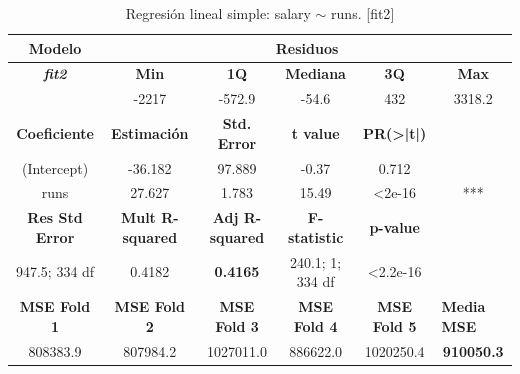 \documentclass[a4paper,12pt, oneside]{book}
\begin{document}
\begin{table}[H]
\footnotesize
\centering
\begin{tabular}{cccccc}
\hline
\textbf{Modelo} & \multicolumn{5}{c}{\textbf{Residuos}} \\ \hline
\textit{\textbf{fit2}} & \textbf{Min} & \textbf{1Q} & \textbf{Mediana} & \textbf{3Q} & \textbf{Max} \\ \cline{2-6} 
\multicolumn{1}{l}{} & -2217 & -572.9 & -54.6 & 432 & 3318.2 \\ \cline{1-5}
\textbf{Coeficiente} & \textbf{Estimación} & \textbf{Std. Error} & \textbf{t value} & \textbf{PR(\textgreater{}|t|)} & \multicolumn{1}{l}{} \\ \cline{1-5}
(Intercept) & -36.182 & 97.889 & -0.37 & 0.712 &  \\
runs & 27.627 & 1.783 & 15.49 & \textless{}2e-16 & *** \\ \cline{1-5}
\textbf{Res Std Error} & \textbf{Mult R-squared} & \textbf{Adj R-squared} & \textbf{F-statistic} & \textbf{p-value} & \multicolumn{1}{l}{} \\ \cline{1-5}
947.5; 334 df & 0.4182 & \textbf{0.4165} & 240.1; 1; 334 df & \textless{}2.2e-16 & \multicolumn{1}{l}{} \\ \hline
\textbf{MSE Fold 1} & \textbf{MSE Fold 2} & \textbf{MSE Fold 3} & \textbf{MSE Fold 4} & \textbf{MSE Fold 5} & \multicolumn{1}{l}{\textbf{Media MSE}} \\ \hline
808383.9 & 807984.2 &1027011.0 & 886622.0 &1020250.4 & \textbf{910050.3}
\end{tabular}
\caption{Regresión lineal simple: salary $\sim$ runs. {[}fit2{]}}
\label{tab:fit2}
\end{table}
\end{document}
